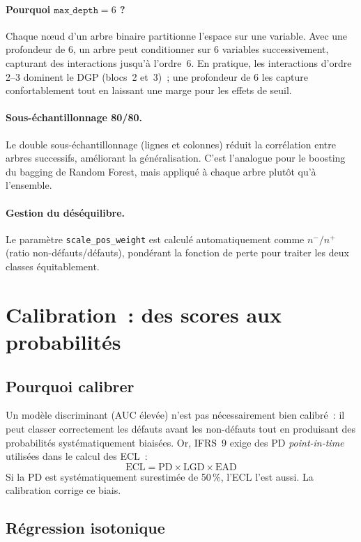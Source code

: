 \documentclass[12pt, a4paper, twoside, openright]{report}
\theoremstyle{definition}
\begin{document}
\paragraph{Pourquoi $\texttt{max\_depth} = 6$ ?} Chaque nœud d'un arbre binaire partitionne l'espace sur une variable. Avec une profondeur de 6, un arbre peut conditionner sur 6 variables successivement, capturant des interactions jusqu'à l'ordre~6. En pratique, les interactions d'ordre 2--3 dominent le DGP (blocs~2 et~3)~; une profondeur de 6 les capture confortablement tout en laissant une marge pour les effets de seuil.

\paragraph{Sous-échantillonnage 80/80.} Le double sous-échantillonnage (lignes et colonnes) réduit la corrélation entre arbres successifs, améliorant la généralisation. C'est l'analogue pour le boosting du bagging de Random Forest, mais appliqué à chaque arbre plutôt qu'à l'ensemble.

\paragraph{Gestion du déséquilibre.} Le paramètre \texttt{scale\_pos\_weight} est calculé automatiquement comme $n^{-}/n^{+}$ (ratio non-défauts/défauts), pondérant la fonction de perte pour traiter les deux classes équitablement.

\section{Calibration~: des scores aux probabilités}
\label{sec:pd:calibration}

\subsection{Pourquoi calibrer}

Un modèle discriminant (AUC élevée) n'est pas nécessairement bien calibré~: il peut classer correctement les défauts avant les non-défauts tout en produisant des probabilités systématiquement biaisées. Or, IFRS~9 exige des PD \emph{point-in-time} utilisées dans le calcul des ECL~:
$$\text{ECL} = \text{PD} \times \text{LGD} \times \text{EAD}$$
Si la PD est systématiquement surestimée de 50\,\%, l'ECL l'est aussi. La calibration corrige ce biais.

\subsection{Régression isotonique}
\end{document}
